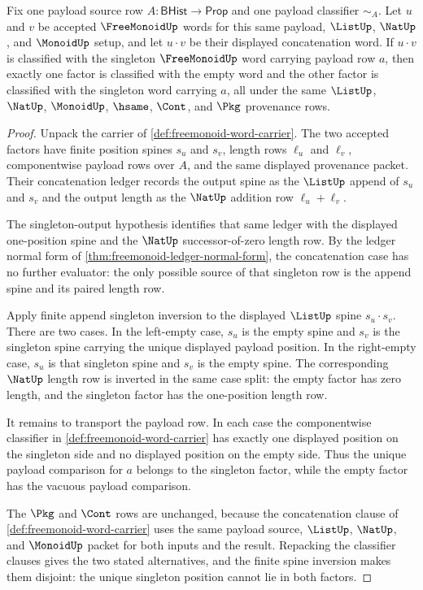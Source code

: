 \begin{theorem}
\label{thm:freemonoid-singleton-concat-inversion}
Fix one payload source row $A:\mathsf{BHist}\to\mathsf{Prop}$ and one
payload classifier $\sim_A$. Let $u$ and $v$ be accepted $\FreeMonoidUp$ words
for this same payload, $\ListUp$, $\NatUp$, and $\MonoidUp$ setup, and let
$u\cdot v$ be their displayed concatenation word. If $u\cdot v$ is classified
with the singleton $\FreeMonoidUp$ word carrying payload row $a$, then exactly
one factor is classified with the empty word and the other factor is classified
with the singleton word carrying $a$, all under the same $\ListUp$, $\NatUp$,
$\MonoidUp$, $\hsame$, $\Cont$, and $\Pkg$ provenance rows.
\end{theorem}
\begin{proof}
Unpack the carrier of \autoref{def:freemonoid-word-carrier}. The two accepted
factors have finite position spines $s_u$ and $s_v$, length rows $\ell_u$ and
$\ell_v$, componentwise payload rows over $A$, and the same displayed
provenance packet. Their concatenation ledger records the output spine as the
$\ListUp$ append of $s_u$ and $s_v$ and the output length as the $\NatUp$
addition row $\ell_u+\ell_v$.

The singleton-output hypothesis identifies that same ledger with the displayed
one-position spine and the $\NatUp$ successor-of-zero length row. By the ledger
normal form of \autoref{thm:freemonoid-ledger-normal-form}, the concatenation
case has no further evaluator: the only possible source of that singleton row
is the append spine and its paired length row.

Apply finite append singleton inversion to the displayed $\ListUp$ spine
$s_u\cdot s_v$. There are two cases. In the left-empty case, $s_u$ is the empty
spine and $s_v$ is the singleton spine carrying the unique displayed payload
position. In the right-empty case, $s_u$ is that singleton spine and $s_v$ is
the empty spine. The corresponding $\NatUp$ length row is inverted in the same
case split: the empty factor has zero length, and the singleton factor has the
one-position length row.

It remains to transport the payload row. In each case the componentwise
classifier in \autoref{def:freemonoid-word-carrier} has exactly one displayed
position on the singleton side and no displayed position on the empty side.
Thus the unique payload comparison for $a$ belongs to the singleton factor,
while the empty factor has the vacuous payload comparison.

The $\Pkg$ and $\Cont$ rows are unchanged, because the concatenation clause of
\autoref{def:freemonoid-word-carrier} uses the same payload source, $\ListUp$,
$\NatUp$, and $\MonoidUp$ packet for both inputs and the result. Repacking the
classifier clauses gives the two stated alternatives, and the finite spine
inversion makes them disjoint: the unique singleton position cannot lie in both
factors.
\end{proof}

